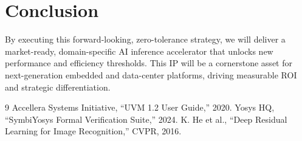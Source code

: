 \documentclass[10pt,twocolumn]{article}
\begin{document}
\section*{Conclusion}
By executing this forward-looking, zero-tolerance strategy, we will deliver a market-ready, domain-specific AI inference accelerator that unlocks new performance and efficiency thresholds. This IP will be a cornerstone asset for next-generation embedded and data-center platforms, driving measurable ROI and strategic differentiation.

\begin{thebibliography}{9}
 Accellera Systems Initiative, “UVM 1.2 User Guide,” 2020.
 Yosys HQ, “SymbiYosys Formal Verification Suite,” 2024.
 K. He et al., “Deep Residual Learning for Image Recognition,” CVPR, 2016.
\end{thebibliography}
\end{document}
